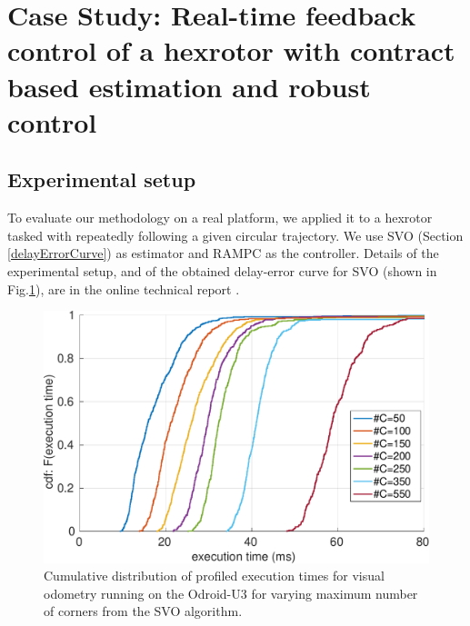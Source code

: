 \section{Case Study: Real-time feedback control of a hexrotor with contract based estimation and robust control}
\label{sec:experiments}

\subsection{Experimental setup}
To evaluate our methodology on a real platform, we applied it to a hexrotor tasked with repeatedly following a given circular trajectory.
We use SVO (Section \ref{delayErrorCurve}) as estimator and RAMPC as the controller.
Details of the experimental setup, and of the obtained delay-error curve for SVO (shown in Fig.\ref{fig:time_ecdf}), are in the online technical report \cite{RTSS15TechRpt324}.


\begin{figure}[htbp]
  \centering
  \includegraphics[width=0.9\columnwidth]{figures/time_ecdf_millisec.pdf}
  \caption{Cumulative distribution of profiled execution times for visual odometry running on the Odroid-U3 for varying maximum number of corners from the SVO algorithm.}
  \label{fig:time_ecdf}
\end{figure}




